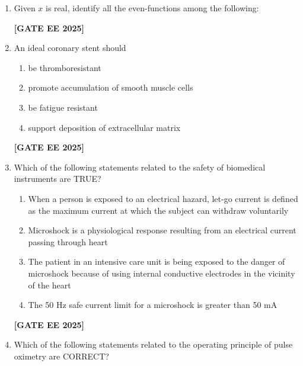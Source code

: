 \documentclass[journal]{IEEEtran}
\newcommand{\qfooter}{%
  \begin{flushright}\footnotesize\textbf{[GATE EE 2025]}\end{flushright}\vspace{1em}%
}
\begin{document}
\begin{enumerate}
\item Given \(x\) is real, identify all the even-functions among the following:

\begin{enumerate}
\end{enumerate}
\qfooter

\item An ideal coronary stent should

\begin{enumerate}

\item be thromboresistant
\item promote accumulation of smooth muscle cells
\item be fatigue resistant
\item support deposition of extracellular matrix

\end{enumerate}
\qfooter

\item Which of the following statements related to the safety of biomedical instruments are TRUE?

\begin{enumerate}
\item When a person is exposed to an electrical hazard, let-go current is defined as the maximum current at which the subject can withdraw voluntarily
\item Microshock is a physiological response resulting from an electrical current passing through heart
\item The patient in an intensive care unit is being exposed to the danger of microshock because of using internal conductive electrodes in the vicinity of the heart
\item The 50 Hz safe current limit for a microshock is greater than 50 mA
\end{enumerate}
\qfooter

\item Which of the following statements related to the operating principle of pulse oximetry are CORRECT?


\end{enumerate}
\end{document}
